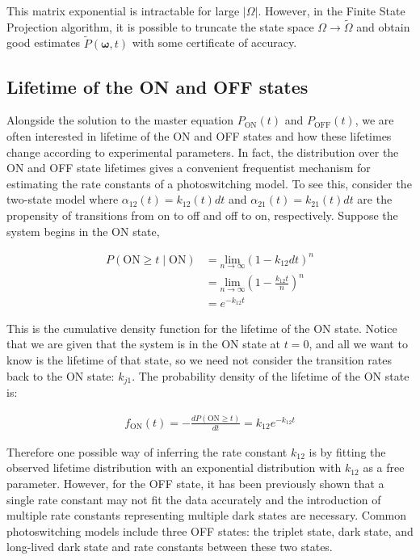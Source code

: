 \documentclass{ucetd}
\begin{document}
This matrix exponential is intractable for large $|\Omega|$. However, in the Finite State Projection algorithm, it is possible to truncate the state space $\Omega \rightarrow \tilde{\Omega}$ and obtain good estimates $\tilde{P}(\bm{\omega}, t)$ with some certificate of accuracy.

\subsection{Lifetime of the ON and OFF states}

Alongside the solution to the master equation $P_{\mathrm{ON}}(t)$ and $P_{\mathrm{OFF}}(t)$, we are often interested in lifetime of the ON and OFF states and how these lifetimes change according to experimental parameters. In fact, the distribution over the ON and OFF state lifetimes gives a convenient frequentist mechanism for estimating the rate constants of a photoswitching model. To see this, consider the two-state model where $\alpha_{12}(t) = k_{12}(t)dt$ and $\alpha_{21}(t) = k_{21}(t)dt$ are the propensity of transitions from on to off and off to on, respectively. Suppose the system begins in the ON state, 

\begin{align*}
P(\mathrm{ON} \geq t \; | \;\mathrm{ON}) &= \underset{n\rightarrow\infty}{\mathrm{lim}}\left(1-k_{12}dt\right)^{n}\\
&= \underset{n\rightarrow\infty}{\mathrm{lim}}\left(1-\frac{k_{12}t}{n}\right)^{n}\\
&= e^{-k_{12}t}
\end{align*}

This is the cumulative density function for the lifetime of the ON state. Notice that we are given that the system is in the ON state at $t=0$, and all we want to know is the lifetime of that state, so we need not consider the transition rates back to the ON state: $k_{j1}$. The probability density of the lifetime of the ON state is: 

\begin{align*}
f_{\mathrm{ON}}(t) = -\frac{dP(\mathrm{ON} \geq t)}{dt} = k_{12}e^{-k_{12}t}
\end{align*}

Therefore one possible way of inferring the rate constant $k_{12}$ is by fitting the observed lifetime distribution with an exponential distribution with $k_{12}$ as a free parameter. However, for the OFF state, it has been previously shown that a single rate constant may not fit the data accurately and the introduction of multiple rate constants representing multiple dark states are necessary. Common photoswitching models include three OFF states: the triplet state, dark state, and long-lived dark state and rate constants between these two states.
\end{document}
